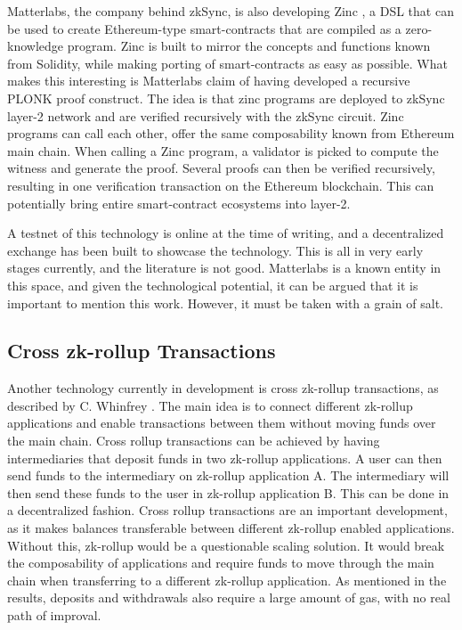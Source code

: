 \documentclass[../../thesis.tex]{subfiles}
\begin{document}
Matterlabs, the company behind zkSync, is also developing Zinc \cite{zinc}, a DSL that can be used to create Ethereum-type smart-contracts that are compiled as a zero-knowledge program. Zinc is built to mirror the concepts and functions known from Solidity, while making porting of smart-contracts as easy as possible. What makes this interesting is Matterlabs claim of having developed a recursive PLONK proof construct. The idea is that zinc programs are deployed to zkSync layer-2 network and are verified recursively with the zkSync circuit. Zinc programs can call each other, offer the same composability known from Ethereum main chain. When calling a Zinc program, a validator is picked to compute the witness and generate the proof. Several proofs can then be verified recursively, resulting in one verification transaction on the Ethereum blockchain. This can potentially bring entire smart-contract ecosystems into layer-2.

A testnet of this technology is online at the time of writing, and a decentralized exchange \cite{zincCurve} has been built to showcase the technology. This is all in very early stages currently, and the literature is not good. Matterlabs is a known entity in this space, and given the technological potential, it can be argued that it is important to mention this work. However, it must be taken with a grain of salt. 

\subsection{Cross zk-rollup Transactions}\label{zk_to_zk_tx}
Another technology currently in development is cross zk-rollup transactions, as described by C. Whinfrey \cite{whinfrey2021hop}. The main idea is to connect different zk-rollup applications and enable transactions between them without moving funds over the main chain. Cross rollup transactions can be achieved by having intermediaries that deposit funds in two zk-rollup applications. A user can then send funds to the intermediary on zk-rollup application A. The intermediary will then send these funds to the user in zk-rollup application B. This can be done in a decentralized fashion. 
Cross rollup transactions are an important development, as it makes balances transferable between different zk-rollup enabled applications. Without this, zk-rollup would be a questionable scaling solution. It would break the composability of applications and require funds to move through the main chain when transferring to a different zk-rollup application. As mentioned in the results, deposits and withdrawals also require a large amount of gas, with no real path of improval. 
\end{document}
